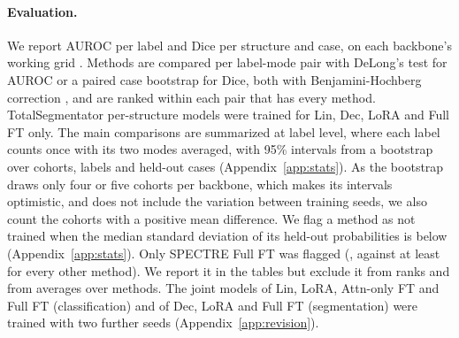 \paragraph{Evaluation.} We report AUROC per label and Dice per structure and case, on each backbone's working grid \citep{maierhein2024metrics}. Methods are compared per label-mode pair with DeLong's test \citep{delong1988} for AUROC or a paired case bootstrap for Dice, both with Benjamini-Hochberg correction \citep{benjamini1995fdr}, and are ranked within each pair that has every method. TotalSegmentator per-structure models were trained for Lin, Dec, LoRA and Full FT only. The main comparisons are summarized at label level, where each label counts once with its two modes averaged, with 95\% intervals from a bootstrap over cohorts, labels and held-out cases (Appendix~\ref{app:stats}). As the bootstrap draws only four or five cohorts per backbone, which makes its intervals optimistic, and does not include the variation between training seeds, we also count the cohorts with a positive mean difference. We flag a method as not trained when the median standard deviation of its held-out probabilities is below \numSpreadMinValue{} (Appendix~\ref{app:stats}). Only SPECTRE Full FT was flagged (\numSpreadSpectreFullft{}, against at least \numSpreadOthermin{} for every other method). We report it in the tables but exclude it from ranks and from averages over methods. The joint models of Lin, LoRA, Attn-only FT and Full FT (classification) and of Dec, LoRA and Full FT (segmentation) were trained with two further seeds (Appendix~\ref{app:revision}).
